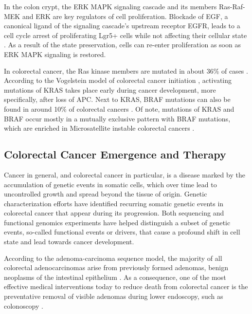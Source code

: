 \begin{flushleft}
In the colon crypt, the ERK MAPK signaling cascade and its members Ras-Raf-MEK and ERK are key regulators of cell proliferation. Blockade of EGF, a canonical ligand of the signaling cascade's upstream receptor EGFR, leads to a cell cycle arrest of proliferating Lgr5+ cells while not affecting their cellular state \cite{basakInducedQuiescenceLgr52017a}. As a result of the state preservation, cells can re-enter proliferation as soon as ERK MAPK signaling is restored.

In colorectal cancer, the Ras kinase members are mutated in about 36\% of cases \cite{Oncol2005}. According to the Vogelstein model of colorectal cancer initiation \cite{Fearon1989}, activating mutations of KRAS takes place early during cancer development, more specifically, after loss of APC.
Next to KRAS, BRAF mutations can also be found in around 10\% of colorectal cancers \cite{Oncol2005}. Of note, mutations of KRAS and BRAF occur mostly in a mutually exclusive pattern with BRAF mutations, which are enriched in Microsatellite instable colorectal cancers \cite{Oncol2005, Sahin2013}. 


\subsection{Colorectal Cancer Emergence and Therapy}

Cancer in general, and colorectal cancer in particular, is a disease marked by the accumulation of genetic events in somatic cells, which over time lead to uncontrolled growth and spread beyond the tissue of origin. Genetic characterization efforts have identified recurring somatic genetic events in colorectal cancer that appear during its progression. Both sequencing and functional genomics experiments have helped distinguish a subset of genetic events, so-called functional events or drivers, that cause a profound shift in cell state and lead towards cancer development. 

According to the adenoma-carcinoma sequence model, the majority of all colorectal adenocarcinomas arise from previously formed adenomas, benign neoplasms of the intestinal epithelium \cite{Cho1992}. As a consequence, one of the most effective medical interventions today to reduce death from colorectal cancer is the preventative removal of visible adenomas during lower endoscopy, such as colonoscopy \cite{Nishihara2013Long-TermEndoscopy}.\par


\end{flushleft}
